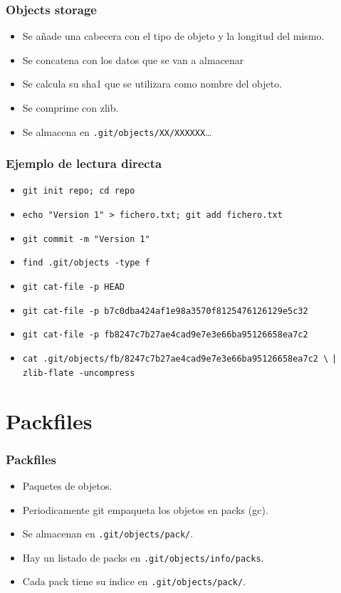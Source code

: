 \documentclass[10pt]{beamer}
\begin{document}
  \begin{frame}[containsverbatim]
    \frametitle{Objects storage}
    \begin{itemize}
        \item Se añade una cabecera con el tipo de objeto y la longitud del mismo.
        \item Se concatena con los datos que se van a almacenar
        \item Se calcula su sha1 que se utilizara como nombre del objeto.
        \item Se comprime con zlib.
        \item Se almacena en \verb$.git/objects/XX/XXXXXX$\dots{}
    \end{itemize}
  \end{frame}

  \begin{frame}[containsverbatim]
    \frametitle{Ejemplo de lectura directa}
    \begin{itemize}
        \item \verb$git init repo; cd repo$
        \item \verb$echo "Version 1" > fichero.txt; git add fichero.txt$
        \item \verb$git commit -m "Version 1"$
        \item \verb$find .git/objects -type f$
        \item \verb$git cat-file -p HEAD$
        \item \verb$git cat-file -p b7c0dba424af1e98a3570f8125476126129e5c32$
        \item \verb$git cat-file -p fb8247c7b27ae4cad9e7e3e66ba95126658ea7c2$
        \item \verb$cat .git/objects/fb/8247c7b27ae4cad9e7e3e66ba95126658ea7c2 \$ \verb$| zlib-flate -uncompress$
    \end{itemize}
  \end{frame}

  \section*{Packfiles}

  \begin{frame}[containsverbatim]
    \frametitle{Packfiles}
    \begin{itemize}
        \item Paquetes de objetos.
        \item Periodicamente git empaqueta los objetos en packs (gc).
        \item Se almacenan en \verb$.git/objects/pack/$.
        \item Hay un listado de packs en \verb$.git/objects/info/packs$.
        \item Cada pack tiene su indice en \verb$.git/objects/pack/$.
    \end{itemize}
  \end{frame}
\end{document}

